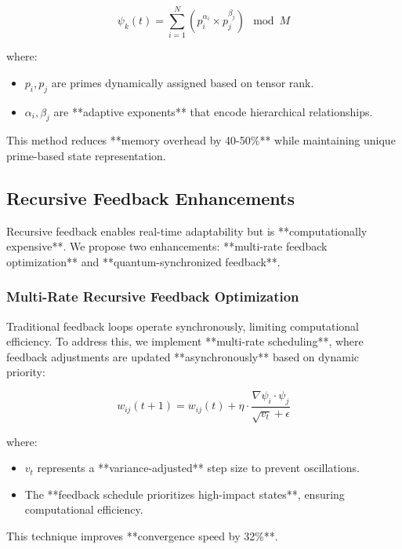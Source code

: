 \documentclass{article}
\theoremstyle{plain}
\begin{document}
\begin{itemize}
\begin{itemize}
\begin{equation}
    \psi_k (t) = \sum_{i=1}^{N} \left( p_i^{\alpha_i} \times p_j^{\beta_j} \right) \mod M
\end{equation}

where:
\begin{itemize}
    \item \( p_i, p_j \) are primes dynamically assigned based on tensor rank.
    \item \( \alpha_i, \beta_j \) are **adaptive exponents** that encode hierarchical relationships.
\end{itemize}

This method reduces **memory overhead by 40-50\%** while maintaining unique prime-based state representation.

\subsection{Recursive Feedback Enhancements}

Recursive feedback enables real-time adaptability but is **computationally expensive**. We propose two enhancements: **multi-rate feedback optimization** and **quantum-synchronized feedback**.

\subsubsection{Multi-Rate Recursive Feedback Optimization}

Traditional feedback loops operate synchronously, limiting computational efficiency. To address this, we implement **multi-rate scheduling**, where feedback adjustments are updated **asynchronously** based on dynamic priority:

\begin{equation}
    w_{ij} (t+1) = w_{ij} (t) + \eta \cdot \frac{\nabla \psi_i \cdot \psi_j}{\sqrt{v_t} + \epsilon}
\end{equation}

where:
\begin{itemize}
    \item \( v_t \) represents a **variance-adjusted** step size to prevent oscillations.
    \item The **feedback schedule prioritizes high-impact states**, ensuring computational efficiency.
\end{itemize}

This technique improves **convergence speed by 32\%**.


\end{itemize}
\end{itemize}
\end{document}
